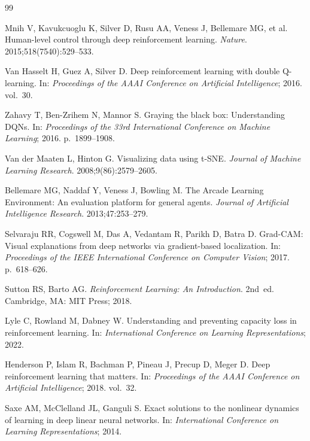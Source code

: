 \documentclass[a4paper]{article}
\begin{document}
\newpage
\begin{thebibliography}{99}

Mnih V, Kavukcuoglu K, Silver D, Rusu AA, Veness J, Bellemare MG, et al.
Human-level control through deep reinforcement learning.
\textit{Nature}. 2015;518(7540):529--533.

Van Hasselt H, Guez A, Silver D.
Deep reinforcement learning with double Q-learning.
In: \textit{Proceedings of the AAAI Conference on Artificial Intelligence}; 2016. vol.~30.

Zahavy T, Ben-Zrihem N, Mannor S.
Graying the black box: Understanding DQNs.
In: \textit{Proceedings of the 33rd International Conference on Machine Learning}; 2016. p.~1899--1908.

Van der Maaten L, Hinton G.
Visualizing data using t-SNE.
\textit{Journal of Machine Learning Research}. 2008;9(86):2579--2605.

Bellemare MG, Naddaf Y, Veness J, Bowling M.
The Arcade Learning Environment: An evaluation platform for general agents.
\textit{Journal of Artificial Intelligence Research}. 2013;47:253--279.

Selvaraju RR, Cogswell M, Das A, Vedantam R, Parikh D, Batra D.
Grad-CAM: Visual explanations from deep networks via gradient-based localization.
In: \textit{Proceedings of the IEEE International Conference on Computer Vision}; 2017. p.~618--626.

Sutton RS, Barto AG.
\textit{Reinforcement Learning: An Introduction}. 2nd~ed.
Cambridge, MA: MIT Press; 2018.

Lyle C, Rowland M, Dabney W.
Understanding and preventing capacity loss in reinforcement learning.
In: \textit{International Conference on Learning Representations}; 2022.

Henderson P, Islam R, Bachman P, Pineau J, Precup D, Meger D.
Deep reinforcement learning that matters.
In: \textit{Proceedings of the AAAI Conference on Artificial Intelligence}; 2018. vol.~32.

Saxe AM, McClelland JL, Ganguli S.
Exact solutions to the nonlinear dynamics of learning in deep linear neural networks.
In: \textit{International Conference on Learning Representations}; 2014.

\end{thebibliography}
\end{document}
